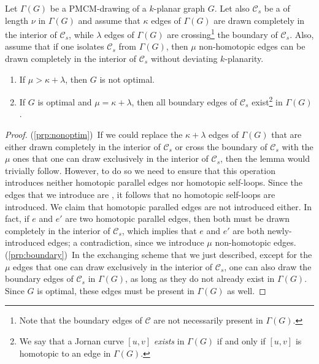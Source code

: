 \begin{lemma}
Let $\Gamma(G)$ be a PMCM-drawing of a $k$-planar graph $G$. Let also $\mathcal{C}_s$ be a \pp of length $\nu$ in $\Gamma(G)$ and assume that $\kappa$ edges of $\Gamma(G)$ are drawn completely in the interior of $\mathcal{C}_s$, while $\lambda$ edges of $\Gamma(G)$ are crossing\footnote{Note that the boundary edges of $\mathcal{C}$ are not necessarily present in $\Gamma(G)$.} the boundary of $\mathcal{C}_s$. Also, assume that if one isolates $\mathcal{C}_s$ from $\Gamma(G)$, then $\mu$ non-homotopic edges can be drawn completely in the interior of $\mathcal{C}_s$ without deviating $k$-planarity. 
\begin{enumerate}
\item \label{prp:nonoptim} If $\mu > \kappa + \lambda$, then $G$ is not optimal.
\item \label{prp:boundary} If $G$ is optimal and $\mu = \kappa + \lambda$, then all boundary edges of $\mathcal{C}_s$ exist\footnote{We say that a Jornan curve $[u,v]$ \emph{exists} in $\Gamma(G)$ if and only if $[u,v]$ is homotopic to an edge in $\Gamma(G)$.} in $\Gamma(G)$.
\end{enumerate}
\label{lem:exchange}
\end{lemma}
\begin{proof}
(\ref*{prp:nonoptim})~If we could replace the $\kappa + \lambda$ edges of $\Gamma(G)$ that are either drawn completely in the interior of $\mathcal{C}_s$ or cross the boundary of $\mathcal{C}_s$ with the $\mu$ ones that one can draw exclusively in the interior of $\mathcal{C}_s$, then the lemma would trivially follow. However, to do so we need to ensure that this operation introduces neither homotopic parallel edges nor homotopic self-loops. Since the edges that we introduce are \pes, it follows that no homotopic self-loops are introduced. We claim that homotopic paralled edges are not introduced either. In fact, if $e$ and $e'$ are two homotopic parallel edges, then both  must be drawn completely in the interior of $\mathcal{C}_s$, which implies that $e$ and $e'$ are both newly-introduced edges; a contradiction, since we introduce $\mu$ non-homotopic edges. (\ref*{prp:boundary})~In the exchanging scheme that we just described, except for the $\mu$ edges that one can draw exclusively in the interior of $\mathcal{C}_s$, one can also draw the boundary edges of $\mathcal{C}_s$ in $\Gamma(G)$, as long as they do not already exist in $\Gamma(G)$. Since $G$ is optimal, these edges must be present in $\Gamma(G)$ as well. 
\end{proof}



